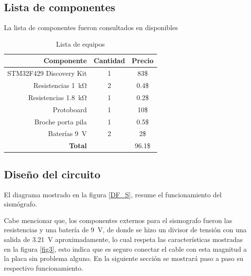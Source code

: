 \subsection*{Lista de componentes}
La lista de componentes fueron consultados en \cite{web2} disponibles
\begin{table}[H]
\caption{Lista de equipos}
\label{table_2}
\begin{center}
\begin{tabular}{r|cc}
\hline
\textbf{Componente}&\textbf{Cantidad}&\textbf{Precio}\\
 \hline
STM32F429 Discovery Kit& 1 & 83\$ \\ \hline 
Resistencias \SI{1}{\kilo\ohm}&2 & 0.4\$ \\ \hline 
Resistencias \SI{1.8}{\kilo\ohm}&1 & 0.2\$ \\ \hline 
Protoboard &1 &10\$ \\ \hline 
Broche porta pila &1 &0.5\$ \\ \hline 
Baterías \SI{9}{\volt} & 2& 2\$ \\ \hline 

 \textbf{Total}& & 96.1\$ \\
 \hline
\end{tabular}
\end{center}
\end{table}

\subsection*{Diseño del circuito}
El diagrama mostrado en la figura \ref{DF_S}, resume el funcionamiento del sismógrafo.

Cabe mencionar que, los componentes externos para el sismografo fueron las resistencias y una batería de \SI{9}{\volt}, de donde se hizo un divisor de tensión con una salida de \SI{3.21}{\volt} aproximadamente, lo cual respeta las características mostradas en la figura \ref{fig3}, esto indica que es seguro conectar el cable con esta magnitud a la placa sin problema alguno. En la siguiente sección se mostrará paso a paso su respectivo funcionamiento.
\newpage
